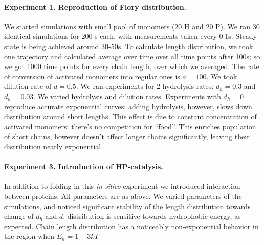 \documentclass[journal=jacsat,manuscript=article,layout=twocolumn]{achemso}
\begin{document}
\paragraph{Experiment 1. Reproduction of Flory distribution.}\label{sec:expt1}
We started simulations with small pool of monomers (20 H and 20 P). We ran 30 identical  
simulations for 200 s each, with measurements taken every 0.1s. Steady state is being achieved 
around 30-50s. To calculate length distribution, we took one trajectory and calculated average 
over time over all time points after 100s; so we got 1000 time points for every chain length, over 
which we averaged. The rate of conversion of activated monomers into regular ones is $a=100$. We 
took dilution rate of $d=0.5$. We ran experiments for 2 hydrolysis rates: $d_h=0.3$ and $d_h=0.03$.
We varied hydrolysis and dilution rates. Experiments with $d_h=0$ reproduce accurate exponential 
curves; adding hydrolysis, however, slows down distribution around short lengths. This effect is 
due to constant concentration of activated monomers: there's no competition for ``food''. This 
enriches population of short chains, however doesn't affect longer chains significantly, leaving 
their distribution nearly exponential.





\paragraph{Experiment 3. Introduction of HP-catalysis.}
In addition to folding in this \textit{in-silico} experiment we introduced interaction between 
proteins. All parameters are as above. We varied parameters of the simulations, and noticed 
significant stability of the length distribution towards change of $d_h$ and $d$. distribution is 
sensitive towards hydrophobic energy, as expected. Chain length distribution has a noticeably 
non-exponential behavior in the region when $E_h= 1-3 kT$



 \newpage
\appendix
\end{document}

